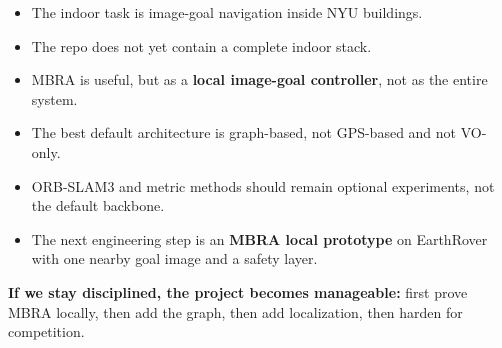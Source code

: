 \documentclass[11pt,a4paper]{article}
\begin{document}
\begin{itemize}
  \item The indoor task is image-goal navigation inside NYU buildings.
  \item The repo does not yet contain a complete indoor stack.
  \item MBRA is useful, but as a \textbf{local image-goal controller}, not as the entire system.
  \item The best default architecture is graph-based, not GPS-based and not VO-only.
  \item ORB-SLAM3 and metric methods should remain optional experiments, not the default backbone.
  \item The next engineering step is an \textbf{MBRA local prototype} on EarthRover with one nearby goal image and a safety layer.
\end{itemize}

\begin{mdframed}
\textbf{If we stay disciplined, the project becomes manageable:}
first prove MBRA locally, then add the graph, then add localization, then harden
for competition.
\end{mdframed}
\end{document}
